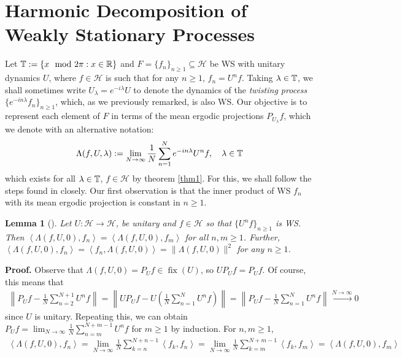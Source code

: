 \documentclass[11pt]{report}
\newcommand{\mc}[1]{\mathcal{#1}}
\newcommand{\ip}[2]{\left\langle#1,#2\right\rangle }
\newcommand{\1}[1]{\mathbbm{1}_{\{#1\}}}
\DeclareMathOperator{\fix}{fix}
\newtheorem{lemma}{Lemma}[section]
\theoremstyle{definition}
\begin{document}
    \section{Harmonic Decomposition of Weakly Stationary Processes}\label{sec4}
    Let $\mathbb{T}:=\{x\mod2\pi:x\in\mathbb{R}\}$ and $F=\{f_n\}_{n\geq
    1}\subseteq\mc{H}$ be WS with unitary dynamics $U$, where $f\in\mc{H}$ is
    such that for any $n\geq 1$, $f_n=U^nf$. Taking $\lambda\in\mathbb{T}$, we
    shall sometimes write $U_\lambda=e^{-i\lambda}U$ to denote the dynamics of
    the \textit{twisting process} $\{e^{-in\lambda}f_n\}_{n\geq 1}$, which, as
    we previously remarked, is also WS. Our objective is to represent each
    element of $F$ in terms of the mean ergodic projections $P_{U_\lambda}f$,
    which we denote with an alternative notation:
    \begin{align}
        \Lambda(f,U,\lambda):=\lim_{N\rightarrow\infty}\frac{1}{N}\sum_{n=1}^N e^{-in\lambda}U^nf,\quad\lambda\in\mathbb{T}
    \end{align}
    which exists for all $\lambda\in\mathbb{T}$, $f\in\mc{H}$ by theorem \ref{thm1}.
    For this, we shall follow the steps found in \cite[\S6]{Fan_1946} closely. Our first observation is
    that the inner product of WS $f_n$ with its mean ergodic projection is constant in $n\geq 1$.
    \begin{lemma}[{\cite[corollary 4]{Fan_1946}}]\label{lem6}
        Let $U:\mc{H}\rightarrow\mc{H}$, be unitary and $f\in\mc{H}$ so that
        $\{U^nf\}_{n\geq 1}$ is WS. Then
        $\ip{\Lambda(f,U,0)}{f_n}=\ip{\Lambda(f,U,0)}{f_m}$ for all $n,m\geq 1$. Further, $\ip{\Lambda(f,U,0)}{f_n}=\ip{f_n}{\Lambda(f,U,0)}=\|\Lambda(f,U,0)\|^2$ for any $n\geq 1$.
    \end{lemma}
    \noindent\textbf{Proof.} Observe that $\Lambda(f,U,0)=P_Uf\in\fix(U)$, so
    $UP_Uf=P_Uf$. Of course, this means that
    \begin{align*}
        \left\|P_Uf-\frac{1}{N}\sum_{n=2}^{N+1}U^nf\right\|=\left\|UP_Uf-U\left(\frac{1}{N}\sum_{n=1}^{N}U^nf\right)\right\|=\left\|P_Uf-\frac{1}{N}\sum_{n=1}^NU^nf\right\|\overset{N\rightarrow\infty}{\longrightarrow} 0
    \end{align*}
    since $U$ is unitary. Repeating this, we can obtain
    $P_Uf=\lim_{N\rightarrow\infty}\frac{1}{N}\sum_{n=m}^{N+m-1}U^nf$ for $m\geq1$
    by induction. For $n,m\geq 1$,
    \begin{align*}
        \ip{\Lambda(f,U,0)}{f_n}=\lim_{N\rightarrow\infty}\frac{1}{N}\sum_{k=n}^{N+n-1}\ip{f_k}{f_n}=\lim_{N\rightarrow\infty}\frac{1}{N}\sum_{k=m}^{N+m-1}\ip{f_k}{f_m}=\ip{\Lambda(f,U,0)}{f_m}
    \end{align*}
\end{document}
